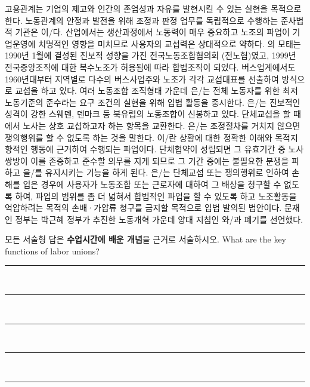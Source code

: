 \documentclass[11pt,answers]{exam}
\begin{document}
\begin{questions}
\question[2] 고용관계는 기업의 \fillin[효율성]{} 제고와 인간의 존엄성과 자유를 발현시킬 수 있는 \fillin[공정성]{} 실현을 목적으로 한다.
\question[2] 노동관계의 안정과 발전을 위해 조정과 판정 업무를 독립적으로 수행하는 준사법적 기관은 \fillin[노동위원회]{}이/다.
\question[2] \fillin[노동집약적]{} 산업에서는 생산과정에서 노동력이 매우 중요하고 노조의 파업이 기업운영에 치명적인 영향을 미치므로 사용자의 교섭력은 상대적으로 약하다.
\question[2] \fillin[민주노총]{}의 모태는 1990년 1월에 결성된 진보적 성향을 가진 전국노동조합협의회 (전노협)였고, 1999년 전국중앙조직에 대한 복수노조가 허용됨에 따라 합법조직이 되었다.
\question[2] 버스업계에서도 1960년대부터 지역별로 다수의 버스사업주와 노조가 각각 교섭대표를 선출하여 \fillin[집단교섭]{} 방식으로 교섭을 하고 있다.
\question[2] 여러 노동조합 조직형태 가운데 \fillin[일반조합]{}은/는 전체 노동자를 위한 최저 노동기준의 준수라는 요구 조건의 실현을 위해 입법 활동을 중시한다.
\question[2] 은/는 진보적인 성격이 강한 스웨덴, 덴마크 등 북유럽의 노동조합이 신봉하고 있다.
\question[2] 단체교섭을 할 때 \fillin[예비회담]{}에서 노사는 상호 교섭하고자 하는 항목을 교환한다.
\question[2] \fillin[조정전치주의]{}은/는 조정절차를 거치지 않으면 쟁의행위를 할 수 없도록 하는 것을 말한다.
\question[2] \fillin[계산적파업]{} 이/란 상황에 대한 정확한 이해와 목적지향적인 행동에 근거하여 수행되는 파업이다.
\question[2] 단체협약이 성립되면 그 유효기간 중 노사 쌍방이 이를 존중하고 준수할 의무를 지게 되므로 그 기간 중에는 불필요한 분쟁을 피하고 \fillin[산업평화]{}을/를 유지시키는 기능을 하게 된다.
\question[2] \fillin[노란봉투법]{}은/는 단체교섭 또는 쟁의행위로 인하여 손해를 입은 경우에 사용자가 노동조합 또는 근로자에 대하여 그 배상을 청구할 수 없도록 하여, 파업의 범위를 좀 더 넓혀서 합법적인 파업을 할 수 있도록 하고 노조활동을 억압하려는 목적의 손배·가압류 청구를 금지할 목적으로 입법 발의된 법안이다.
\question[2] 문재인 정부는 박근혜 정부가 추진한 노동개혁 가운데 양대 지침인 \fillin[일반해고]{}와/과 \fillin[취업규칙 변경·완화]{} 폐기를 선언했다.
\pagebreak

{\large
    모든 서술형 답은 \textbf{수업시간에 배운 개념}을 근거로 서술하시오.
}
\question[10] What are the key functions of labor unions? \\[3pt]
    \rule{\linewidth}{0.4pt} \\[3pt]
    \rule{\linewidth}{0.4pt} \\[3pt]
    \rule{\linewidth}{0.4pt} \\[3pt]
    \rule{\linewidth}{0.4pt} \\[3pt]
    \rule{\linewidth}{0.4pt}

\end{questions}

\end{document}
